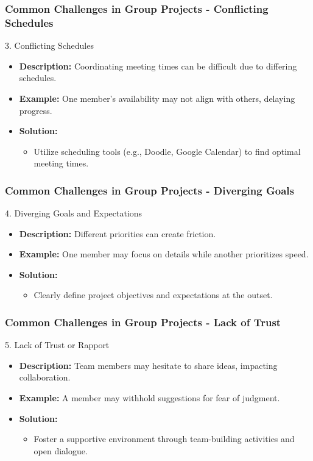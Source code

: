 \documentclass[aspectratio=169]{beamer}
\begin{document}
\begin{frame}[fragile]
  \frametitle{Common Challenges in Group Projects - Conflicting Schedules}
  \begin{block}{3. Conflicting Schedules}
    \begin{itemize}
      \item \textbf{Description:} Coordinating meeting times can be difficult due to differing schedules.
      \item \textbf{Example:} One member's availability may not align with others, delaying progress.
      \item \textbf{Solution:} 
        \begin{itemize}
          \item Utilize scheduling tools (e.g., Doodle, Google Calendar) to find optimal meeting times.
        \end{itemize}
    \end{itemize}
  \end{block}
\end{frame}

\begin{frame}[fragile]
  \frametitle{Common Challenges in Group Projects - Diverging Goals}
  \begin{block}{4. Diverging Goals and Expectations}
    \begin{itemize}
      \item \textbf{Description:} Different priorities can create friction.
      \item \textbf{Example:} One member may focus on details while another prioritizes speed.
      \item \textbf{Solution:} 
        \begin{itemize}
          \item Clearly define project objectives and expectations at the outset.
        \end{itemize}
    \end{itemize}
  \end{block}
\end{frame}

\begin{frame}[fragile]
  \frametitle{Common Challenges in Group Projects - Lack of Trust}
  \begin{block}{5. Lack of Trust or Rapport}
    \begin{itemize}
      \item \textbf{Description:} Team members may hesitate to share ideas, impacting collaboration.
      \item \textbf{Example:} A member may withhold suggestions for fear of judgment.
      \item \textbf{Solution:} 
        \begin{itemize}
          \item Foster a supportive environment through team-building activities and open dialogue.
        \end{itemize}
    \end{itemize}
  \end{block}
\end{frame}
\end{document}
